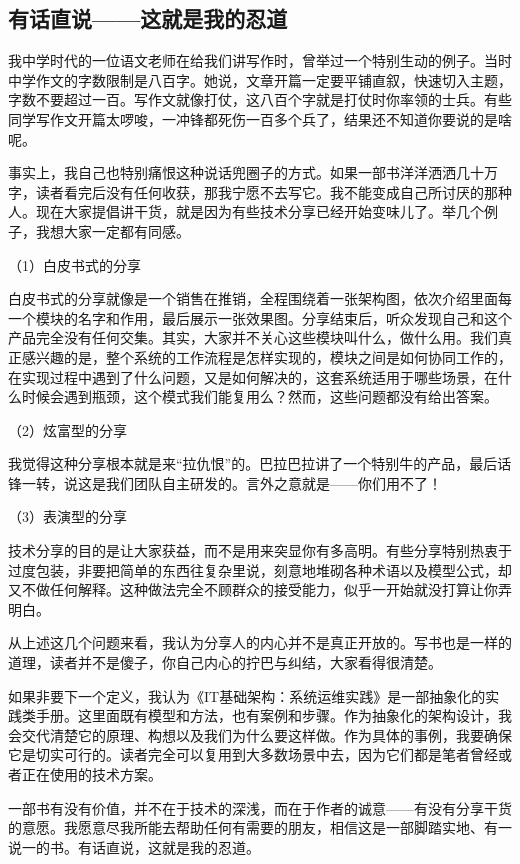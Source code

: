 \documentclass[12pt,UTF8]{ctexbook}
\begin{document}
\subsection{有话直说——这就是我的忍道}

我中学时代的一位语文老师在给我们讲写作时，曾举过一个特别生动的例子。当时中学作文的字数限制是八百字。她说，文章开篇一定要平铺直叙，快速切入主题，字数不要超过一百。写作文就像打仗，这八百个字就是打仗时你率领的士兵。有些同学写作文开篇太啰唆，一冲锋都死伤一百多个兵了，结果还不知道你要说的是啥呢。

事实上，我自己也特别痛恨这种说话兜圈子的方式。如果一部书洋洋洒洒几十万字，读者看完后没有任何收获，那我宁愿不去写它。我不能变成自己所讨厌的那种人。现在大家提倡讲干货，就是因为有些技术分享已经开始变味儿了。举几个例子，我想大家一定都有同感。

（1）白皮书式的分享

白皮书式的分享就像是一个销售在推销，全程围绕着一张架构图，依次介绍里面每一个模块的名字和作用，最后展示一张效果图。分享结束后，听众发现自己和这个产品完全没有任何交集。其实，大家并不关心这些模块叫什么，做什么用。我们真正感兴趣的是，整个系统的工作流程是怎样实现的，模块之间是如何协同工作的，在实现过程中遇到了什么问题，又是如何解决的，这套系统适用于哪些场景，在什么时候会遇到瓶颈，这个模式我们能复用么？然而，这些问题都没有给出答案。

（2）炫富型的分享

我觉得这种分享根本就是来“拉仇恨”的。巴拉巴拉讲了一个特别牛的产品，最后话锋一转，说这是我们团队自主研发的。言外之意就是——你们用不了！

（3）表演型的分享

技术分享的目的是让大家获益，而不是用来突显你有多高明。有些分享特别热衷于过度包装，非要把简单的东西往复杂里说，刻意地堆砌各种术语以及模型公式，却又不做任何解释。这种做法完全不顾群众的接受能力，似乎一开始就没打算让你弄明白。

从上述这几个问题来看，我认为分享人的内心并不是真正开放的。写书也是一样的道理，读者并不是傻子，你自己内心的拧巴与纠结，大家看得很清楚。

如果非要下一个定义，我认为《IT基础架构：系统运维实践》是一部抽象化的实践类手册。这里面既有模型和方法，也有案例和步骤。作为抽象化的架构设计，我会交代清楚它的原理、构想以及我们为什么要这样做。作为具体的事例，我要确保它是切实可行的。读者完全可以复用到大多数场景中去，因为它们都是笔者曾经或者正在使用的技术方案。

一部书有没有价值，并不在于技术的深浅，而在于作者的诚意——有没有分享干货的意愿。我愿意尽我所能去帮助任何有需要的朋友，相信这是一部脚踏实地、有一说一的书。有话直说，这就是我的忍道。
\end{document}
